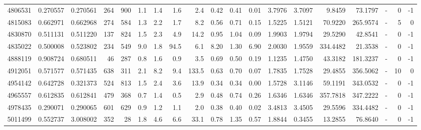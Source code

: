 \begin{tabular}{rrrrrrrrrrrrrrrrlrr}
   4806531 & 0.270557 &   0.270561 &  264 &  900 &      1.1 &      1.4 &     1.6 &      2.4 &       0.42 &        0.41 &        0.01 &  3.7976 &  3.7097 &    9.8459 &   73.1797 &             - &        0 &         -1 \\
   4815083 & 0.662971 &   0.662968 &  274 &  584 &      1.3 &      2.2 &     1.7 &      8.2 &       0.56 &        0.71 &        0.15 &  1.5225 &  1.5121 &   70.9220 &  265.9574 &             - &        5 &          0 \\
   4830870 & 0.511131 &   0.511220 &  137 &  824 &      1.5 &      2.3 &     4.9 &     14.2 &       0.95 &        1.04 &        0.09 &  1.9903 &  1.9794 &   29.5290 &   42.8541 &             - &        0 &         -1 \\
   4835022 & 0.500008 &   0.523802 &  234 &  549 &      9.0 &      1.8 &    94.5 &      6.1 &       8.20 &        1.30 &        6.90 &  2.0030 &  1.9559 &  334.4482 &   21.3538 &             - &        0 &         -1 \\
   4888119 & 0.908724 &   0.680511 &   46 &  287 &      0.8 &      1.6 &     0.9 &      3.5 &       0.69 &        0.50 &        0.19 &  1.1235 &  1.4750 &   43.3182 &  181.3237 &             - &        0 &         -1 \\
   4912051 & 0.571577 &   0.571435 &  638 &  311 &      2.1 &      8.2 &     9.4 &    133.5 &       0.63 &        0.70 &        0.07 &  1.7835 &  1.7528 &   29.4855 &  356.5062 &             - &       10 &          0 \\
   4954142 & 0.642728 &   0.321373 &  524 &  813 &      1.5 &      2.4 &     3.6 &     13.9 &       0.34 &        0.34 &        0.00 &  1.5728 &  3.1146 &   59.1191 &  343.0532 &             - &        0 &         -1 \\
   4965557 & 0.612835 &   0.612841 &  479 &  368 &      0.7 &      1.4 &     0.5 &      2.9 &       0.48 &        0.74 &        0.26 &  1.6346 &  1.6346 &  357.7818 &  347.2222 &             - &        0 &         -1 \\
   4978435 & 0.290071 &   0.290065 &  601 &  629 &      0.9 &      1.2 &     1.1 &      2.0 &       0.38 &        0.40 &        0.02 &  3.4813 &  3.4505 &   29.5596 &  334.4482 &             - &        0 &         -1 \\
   5011499 & 0.552737 &   3.008002 &  352 &   28 &      1.8 &      4.6 &     6.6 &     33.1 &       0.78 &        1.35 &        0.57 &  1.8844 &  0.3455 &   13.2855 &   76.8640 &             - &        0 &         -1 \\

\end{tabular}
